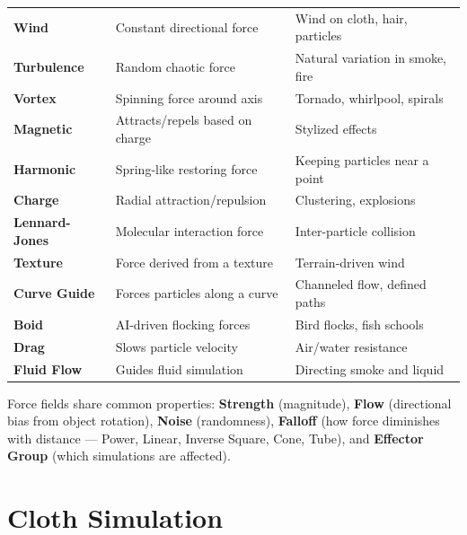 \begin{center}
\begin{tabularx}{\textwidth}{L{2.5cm}L{4cm}X}
\toprule
{}
 &  &  \\
\midrule
\textbf{Wind} & Constant directional force & Wind on cloth, hair, particles \\
\textbf{Turbulence} & Random chaotic force & Natural variation in smoke, fire \\
\textbf{Vortex} & Spinning force around axis & Tornado, whirlpool, spirals \\
\textbf{Magnetic} & Attracts/repels based on charge & Stylized effects \\
\textbf{Harmonic} & Spring-like restoring force & Keeping particles near a point \\
\textbf{Charge} & Radial attraction/repulsion & Clustering, explosions \\
\textbf{Lennard-Jones} & Molecular interaction force & Inter-particle collision \\
\textbf{Texture} & Force derived from a texture & Terrain-driven wind \\
\textbf{Curve Guide} & Forces particles along a curve & Channeled flow, defined paths \\
\textbf{Boid} & AI-driven flocking forces & Bird flocks, fish schools \\
\textbf{Drag} & Slows particle velocity & Air/water resistance \\
\textbf{Fluid Flow} & Guides fluid simulation & Directing smoke and liquid \\
\bottomrule
\end{tabularx}
\end{center}

Force fields share common properties: \textbf{Strength} (magnitude), \textbf{Flow} (directional bias from object rotation), \textbf{Noise} (randomness), \textbf{Falloff} (how force diminishes with distance --- Power, Linear, Inverse Square, Cone, Tube), and \textbf{Effector Group} (which simulations are affected).


\section{Cloth Simulation}
\label{sec:cloth}

